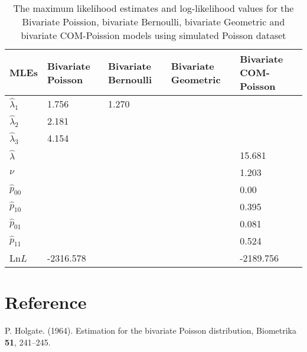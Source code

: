 \documentclass[12pt]{article}
\begin{document}
\begin{table}[H]
	\begin{center}
		\caption[\textbf{2}]
		{The maximum likelihood estimates and log-likelihood values for the Bivariate Poission, bivariate Bernoulli, bivariate Geometric and bivariate COM-Poission models using simulated Poisson dataset }
		\small
		\vspace{-1em}
		\begin{tabular}{lllll}
			\hline	\hline
			\textbf{MLEs} &\textbf{Bivariate Poisson}  & \textbf{Bivariate Bernoulli}&\textbf{Bivariate Geometric}& \textbf{Bivariate COM-Poisson}   \\
			\hline
			$\hat{\lambda}_1$&	1.756  & 1.270&& \\
			$\hat{\lambda}_2$ & 2.181 & && \\
			$\hat{\lambda}_3$  & 4.154   & &&	 \\
			$\hat{\lambda}$  &  &   &&15.681\\
			$\nu$ &  &  &&1.203\\
			$\hat{p}_{00}$  &  & &&0.00\\
			$\hat{p}_{10}$ &&&&0.395\\
			$\hat{p}_{01}$ &&&&0.081\\
			$\hat{p}_{11}$ &&&&0.524\\
			Ln$L$ &-2316.578&&&-2189.756\\
			\hline
		\end{tabular}
	\end{center}
\end{table}


\newpage
\section{Reference}
P. Holgate. (1964). Estimation for the bivariate Poisson distribution, Biometrika \textbf{51}, 241–245.
\end{document}
